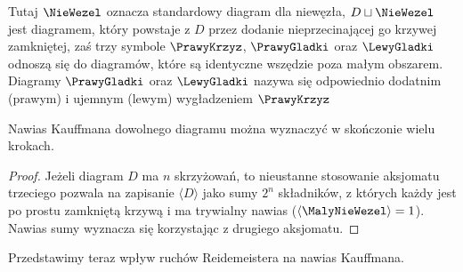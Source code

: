 Tutaj $\NieWezel$ oznacza standardowy diagram dla niewęzła, $D \sqcup \NieWezel$ jest diagramem, który powstaje z $D$ przez dodanie nieprzecinającej go krzywej zamkniętej, zaś trzy symbole $\PrawyKrzyz$, $\PrawyGladki$ oraz $\LewyGladki $ odnoszą się do diagramów, które są identyczne wszędzie poza małym obszarem.
Diagramy $\PrawyGladki$ oraz $\LewyGladki$ nazywa się odpowiednio dodatnim (prawym) i ujemnym (lewym) wygładzeniem $\PrawyKrzyz$

\begin{lemat}
	Nawias Kauffmana dowolnego diagramu można wyznaczyć w skończonie wielu krokach.
\end{lemat}

\begin{proof}
	Jeżeli diagram $D$ ma $n$ skrzyżowań, to nieustanne stosowanie aksjomatu trzeciego pozwala na zapisanie $\langle D \rangle$ jako sumy $2^n$ składników, z których każdy jest po prostu zamkniętą krzywą i ma trywialny nawias ($\langle \MalyNieWezel \rangle = 1$).
	Nawias sumy wyznacza się korzystając z drugiego aksjomatu.
\end{proof}

Przedstawimy teraz wpływ ruchów Reidemeistera na nawias Kauffmana.

